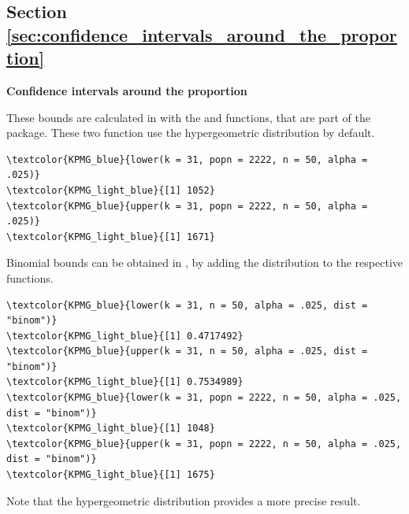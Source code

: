 \subsection{Section \ref{sec:confidence_intervals_around_the_proportion}}

\begin{exercise}
\label{ex:conf_ind_fraction}

\textbf{Confidence intervals around the proportion}

These bounds are calculated in  with the  and  functions, that are part of the  package. These two function use the hypergeometric distribution by default.

\begin{Verbatim}[commandchars=\\\{\}]
\textcolor{KPMG_blue}{lower(k = 31, popn = 2222, n = 50, alpha = .025)}
\textcolor{KPMG_light_blue}{[1] 1052}
\textcolor{KPMG_blue}{upper(k = 31, popn = 2222, n = 50, alpha = .025)}
\textcolor{KPMG_light_blue}{[1] 1671}
\end{Verbatim}

Binomial bounds can be obtained in , by adding the distribution to the respective functions.

\begin{Verbatim}[commandchars=\\\{\}]
\textcolor{KPMG_blue}{lower(k = 31, n = 50, alpha = .025, dist = "binom")}
\textcolor{KPMG_light_blue}{[1] 0.4717492}
\textcolor{KPMG_blue}{upper(k = 31, n = 50, alpha = .025, dist = "binom")}
\textcolor{KPMG_light_blue}{[1] 0.7534989}
\textcolor{KPMG_blue}{lower(k = 31, popn = 2222, n = 50, alpha = .025, dist = "binom")}
\textcolor{KPMG_light_blue}{[1] 1048}
\textcolor{KPMG_blue}{upper(k = 31, popn = 2222, n = 50, alpha = .025, dist = "binom")}
\textcolor{KPMG_light_blue}{[1] 1675}
\end{Verbatim}

\end{exercise}

Note that the hypergeometric distribution provides a more precise result.

